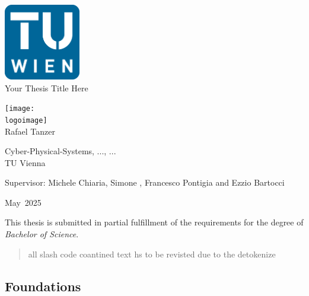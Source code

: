 \documentclass[11pt]{report}
\newcommand{\thesistitle}{Your Thesis Title Here}
\newcommand{\authorname}{Rafael Tanzer}
\newcommand{\supervisor}{Michele Chiaria, Simone , Francesco Pontigia and Ezzio Bartocci}
\newcommand{\institution}{TU Vienna}
\newcommand{\department}{Cyber-Physical-Systems, ..., ...}
\newcommand{\logoimage}{graphics/logo.png} %
\newcommand{\submissionmonth}{May}
\newcommand{\submissionyear}{2025}
\begin{document}
\begin{titlepage}
  \centering
  \vspace*{1cm}

  \includegraphics[width=0.25\textwidth]{graphics/tuWienLogo.png}
  \\[1cm]

  {\Huge \thesistitle\\[1.5cm]}

  \texttt{[image: \\logoimage]}\\[1cm]

  {\Large \authorname\\[0.5cm]}

  {\large \department\\
  \institution\\[1.5cm]}

  {\large Supervisor: \supervisor\\[2cm]}

  {\large \submissionmonth~\submissionyear\\}

  \vfill

  \vspace*{0.5cm}
  {\small This thesis is submitted in partial fulfillment of the requirements for the degree of \textit{Bachelor of Science}.}

\end{titlepage}


\begin{abstract}
  all slash code coantined text hs to be revisted due to the detokenize
\end{abstract}

\tableofcontents


\begin{refsection}
  \part{Foundations}
  
\end{refsection}
\end{document}
